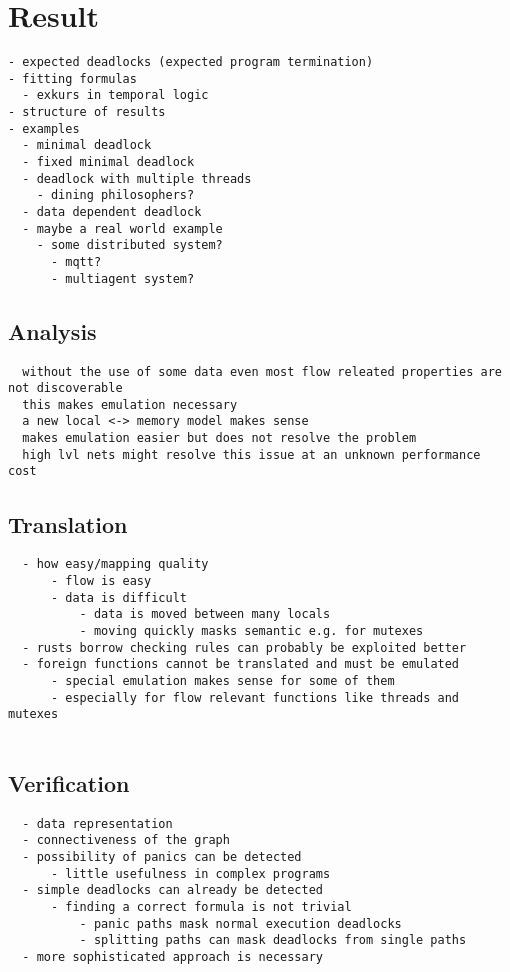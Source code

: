 \chapter{Result}
\label{results}
\begin{verbatim}
- expected deadlocks (expected program termination)
- fitting formulas
  - exkurs in temporal logic
- structure of results
- examples
  - minimal deadlock
  - fixed minimal deadlock
  - deadlock with multiple threads
    - dining philosophers?
  - data dependent deadlock
  - maybe a real world example
    - some distributed system?
      - mqtt?
      - multiagent system?
\end{verbatim}


\section{Analysis}
\begin{verbatim}
  without the use of some data even most flow releated properties are not discoverable
  this makes emulation necessary
  a new local <-> memory model makes sense
  makes emulation easier but does not resolve the problem
  high lvl nets might resolve this issue at an unknown performance cost
  \end{verbatim}
  
  \section{Translation}
  \begin{verbatim}
  - how easy/mapping quality
      - flow is easy
      - data is difficult
          - data is moved between many locals
          - moving quickly masks semantic e.g. for mutexes
  - rusts borrow checking rules can probably be exploited better
  - foreign functions cannot be translated and must be emulated
      - special emulation makes sense for some of them
      - especially for flow relevant functions like threads and mutexes
  
  \end{verbatim}
  
  \section{Verification}
  \begin{verbatim}
  - data representation
  - connectiveness of the graph
  - possibility of panics can be detected
      - little usefulness in complex programs
  - simple deadlocks can already be detected
      - finding a correct formula is not trivial
          - panic paths mask normal execution deadlocks
          - splitting paths can mask deadlocks from single paths
  - more sophisticated approach is necessary
  \end{verbatim}